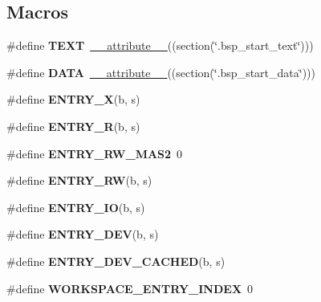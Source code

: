 \subsection*{Macros}
\begin{DoxyCompactItemize}
\item 
\mbox{\label{powerpc_2qoriq_2start_2mmu-config_8c_a52e3db5a1724beab41ebbabe72460f12}} 
\#define {\bfseries T\+E\+XT}~\mbox{\hyperlink{struct____attribute____}{\+\_\+\+\_\+attribute\+\_\+\+\_\+}}((section(\char`\"{}.bsp\+\_\+start\+\_\+text\char`\"{})))
\item 
\mbox{\label{powerpc_2qoriq_2start_2mmu-config_8c_aad9ae913bdfab20dd94ad04ee2d5b045}} 
\#define {\bfseries D\+A\+TA}~\mbox{\hyperlink{struct____attribute____}{\+\_\+\+\_\+attribute\+\_\+\+\_\+}}((section(\char`\"{}.bsp\+\_\+start\+\_\+data\char`\"{})))
\item 
\#define {\bfseries E\+N\+T\+R\+Y\+\_\+X}(b,  s)
\item 
\#define {\bfseries E\+N\+T\+R\+Y\+\_\+R}(b,  s)
\item 
\mbox{\label{powerpc_2qoriq_2start_2mmu-config_8c_ac796323842e883d77e12ff2a34d889f6}} 
\#define {\bfseries E\+N\+T\+R\+Y\+\_\+\+R\+W\+\_\+\+M\+A\+S2}~0
\item 
\#define {\bfseries E\+N\+T\+R\+Y\+\_\+\+RW}(b,  s)
\item 
\#define {\bfseries E\+N\+T\+R\+Y\+\_\+\+IO}(b,  s)
\item 
\#define {\bfseries E\+N\+T\+R\+Y\+\_\+\+D\+EV}(b,  s)
\item 
\#define {\bfseries E\+N\+T\+R\+Y\+\_\+\+D\+E\+V\+\_\+\+C\+A\+C\+H\+ED}(b,  s)
\item 
\mbox{\label{powerpc_2qoriq_2start_2mmu-config_8c_ac05a6e7a1861d55208af539ac3672b28}} 
\#define {\bfseries W\+O\+R\+K\+S\+P\+A\+C\+E\+\_\+\+E\+N\+T\+R\+Y\+\_\+\+I\+N\+D\+EX}~0
\end{DoxyCompactItemize}

